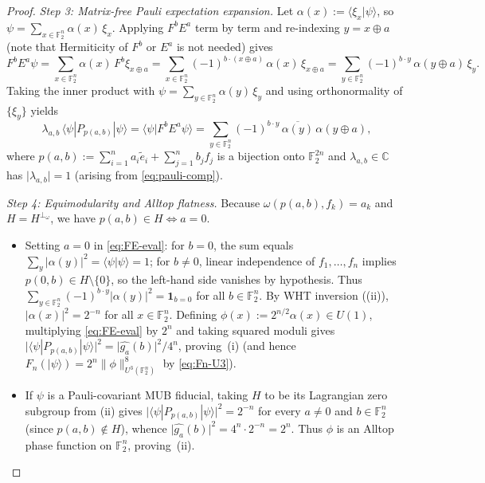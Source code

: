\documentclass[11pt,a4paper]{article}
\theoremstyle{plain}
\theoremstyle{definition}
\theoremstyle{remark}
\newcommand{\C}{\mathbb{C}}
\newcommand{\F}{\mathbb{F}}
\newcommand{\Uone}{U(1)}
\newcommand{\ket}[1]{|#1\rangle}
\newcommand{\braket}[2]{\langle#1|#2\rangle}
\newcommand{\expval}[2]{\langle#1|#2|#1\rangle}
\newcommand{\abs}[1]{\lvert#1\rvert}
\newcommand{\norm}[1]{\lVert#1\rVert}
\newcommand{\indic}[1]{\mathbf{1}_{#1}}
\numberwithin{equation}{section}
\begin{document}
\begin{proof}
\emph{Step 3: Matrix-free Pauli expectation expansion.}
Let $\alpha(x) := \braket{\xi_x}{\psi}$, so $\psi = \sum_{x \in \F_2^n} \alpha(x)\, \xi_x$. Applying $F^b E^a$ term by term and re-indexing $y = x \oplus a$ (note that Hermiticity of $F^b$ or $E^a$ is not needed) gives
\[
  F^b E^a \psi = \sum_{x \in \F_2^n} \alpha(x)\, F^b \xi_{x \oplus a}
  = \sum_{x \in \F_2^n} (-1)^{b \cdot (x \oplus a)}\,\alpha(x)\, \xi_{x \oplus a}
  = \sum_{y \in \F_2^n} (-1)^{b \cdot y}\,\alpha(y \oplus a)\, \xi_y.
\]
Taking the inner product with $\psi = \sum_{y \in \F_2^n} \alpha(y)\, \xi_y$ and using orthonormality of $\{\xi_y\}$ yields
\begin{equation}\label{eq:FE-eval}
  \lambda_{a,b}\,\expval{\psi}{P_{p(a,b)}} = \braket{\psi}{F^b E^a \psi}
  = \sum_{y \in \F_2^n} (-1)^{b \cdot y}\,\overline{\alpha(y)}\,\alpha(y \oplus a),
\end{equation}
where $p(a, b) := \sum_{i=1}^n a_i \tilde{e}_i + \sum_{j=1}^n b_j f_j$ is a bijection onto $\F_2^{2n}$ and $\lambda_{a,b} \in \C$ has $\abs{\lambda_{a,b}} = 1$ (arising from \eqref{eq:pauli-comp}).

\emph{Step 4: Equimodularity and Alltop flatness.}
Because $\omega(p(a, b), f_k) = a_k$ and $H = H^{\perp_\omega}$, we have $p(a, b) \in H \iff a = 0$.
\begin{itemize}[leftmargin=1.8em]
  \item Setting $a = 0$ in \eqref{eq:FE-eval}: for $b = 0$, the sum equals $\sum_y \abs{\alpha(y)}^2 = \braket{\psi}{\psi} = 1$; for $b \neq 0$, linear independence of $f_1, \dots, f_n$ implies $p(0, b) \in H \setminus \{0\}$, so the left-hand side vanishes by hypothesis. Thus $\sum_{y \in \F_2^n} (-1)^{b \cdot y} \abs{\alpha(y)}^2 = \indic{b = 0}$ for all $b \in \F_2^n$. By WHT inversion ((ii)), $\abs{\alpha(x)}^2 = 2^{-n}$ for all $x \in \F_2^n$. Defining $\phi(x) := 2^{n/2}\alpha(x) \in \Uone$, multiplying \eqref{eq:FE-eval} by $2^n$ and taking squared moduli gives $\abs{\expval{\psi}{P_{p(a,b)}}}^2 = \abs{\widehat{g_a}(b)}^2 / 4^n$, proving~(i) (and hence $F_n(\ket{\psi}) = 2^n\norm{\phi}_{U^3(\F_2^n)}^8$ by \eqref{eq:Fn-U3}).
  \item If $\psi$ is a Pauli-covariant MUB fiducial, taking $H$ to be its Lagrangian zero subgroup from (ii) gives $\abs{\expval{\psi}{P_{p(a,b)}}}^2 = 2^{-n}$ for every $a \neq 0$ and $b \in \F_2^n$ (since $p(a, b) \notin H$), whence $\abs{\widehat{g_a}(b)}^2 = 4^n \cdot 2^{-n} = 2^n$. Thus $\phi$ is an Alltop phase function on $\F_2^n$, proving~(ii). \qedhere
\end{itemize}
\end{proof}
\end{document}
